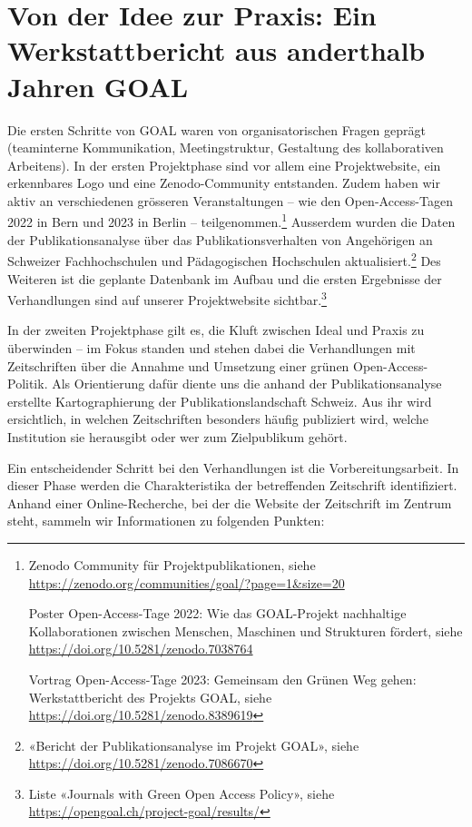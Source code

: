 \documentclass[a4paper,
fontsize=11pt,
oneside,
numbers=noperiodatend,
parskip=half-,
bibliography=totoc,
final
]{scrartcl}
\begin{document}
\hypertarget{von-der-idee-zur-praxis-ein-werkstattbericht-aus-anderthalb-jahren-goal}{%
\section{Von der Idee zur Praxis: Ein Werkstattbericht aus
anderthalb Jahren
GOAL}\label{von-der-idee-zur-praxis-ein-werkstattbericht-aus-anderthalb-jahren-goal}}

Die ersten Schritte von GOAL waren von organisatorischen Fragen geprägt
(teaminterne Kommunikation, Meetingstruktur, Gestaltung des
kollaborativen Arbeitens). In der ersten Projektphase sind vor allem
eine Projektwebsite, ein erkennbares Logo und eine Zenodo-Community
entstanden. Zudem haben wir aktiv an verschiedenen grösseren
Veranstaltungen -- wie den Open-Access-Tagen 2022 in Bern und 2023 in
Berlin -- teilgenommen.\footnote{Zenodo Community für
  Projektpublikationen, siehe
  \url{https://zenodo.org/communities/goal/?page=1&size=20}

  Poster Open-Access-Tage 2022: Wie das GOAL-Projekt nachhaltige
  Kollaborationen zwischen Menschen, Maschinen und Strukturen fördert,
  siehe \url{https://doi.org/10.5281/zenodo.7038764}

  Vortrag Open-Access-Tage 2023: Gemeinsam den Grünen Weg gehen:
  Werkstattbericht des Projekts GOAL, siehe
  \url{https://doi.org/10.5281/zenodo.8389619}} Ausserdem wurden die
Daten der Publikationsanalyse über das Publikationsverhalten von
Angehörigen an Schweizer Fachhochschulen und Pädagogischen Hochschulen
aktualisiert.\footnote{«Bericht der Publikationsanalyse im Projekt
  GOAL», siehe \url{https://doi.org/10.5281/zenodo.7086670}} Des
Weiteren ist die geplante Datenbank im Aufbau und die ersten Ergebnisse
der Verhandlungen sind auf unserer Projektwebsite sichtbar.\footnote{Liste
  «Journals with Green Open Access Policy», siehe
  \url{https://opengoal.ch/project-goal/results/}}

In der zweiten Projektphase gilt es, die Kluft zwischen Ideal und Praxis
zu überwinden -- im Fokus standen und stehen dabei die Verhandlungen mit
Zeitschriften über die Annahme und Umsetzung einer grünen
Open-Access-Politik. Als Orientierung dafür diente uns die anhand der
Publikationsanalyse erstellte Kartographierung der
Publikationslandschaft Schweiz. Aus ihr wird ersichtlich, in welchen
Zeitschriften besonders häufig publiziert wird, welche Institution sie
herausgibt oder wer zum Zielpublikum gehört.

Ein entscheidender Schritt bei den Verhandlungen ist die
Vorbereitungsarbeit. In dieser Phase werden die Charakteristika der
betreffenden Zeitschrift identifiziert. Anhand einer Online-Recherche,
bei der die Website der Zeitschrift im Zentrum steht, sammeln wir
Informationen zu folgenden Punkten:
\end{document}
